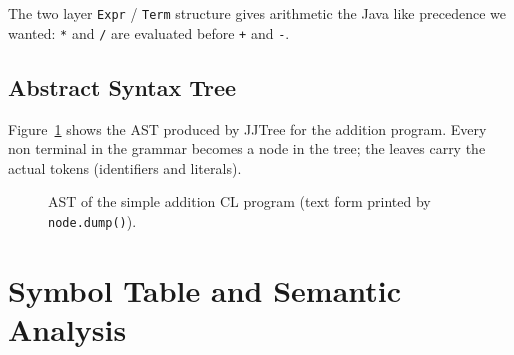 \documentclass[12pt,a4paper]{report}
\begin{document}
The two layer \texttt{Expr} / \texttt{Term} structure gives arithmetic the Java like precedence we wanted: \texttt{*} and \texttt{/} are evaluated before \texttt{+} and \texttt{-}.

\section{Abstract Syntax Tree}

Figure~\ref{fig:ast} shows the AST produced by JJTree for the addition program. Every non terminal in the grammar becomes a node in the tree; the leaves carry the actual tokens (identifiers and literals).

\begin{figure}[H]
\centering
{}
\caption{AST of the simple addition CL program (text form printed by \texttt{node.dump()}).}
\label{fig:ast}
\end{figure}

\chapter{Symbol Table and Semantic Analysis}
\end{document}
